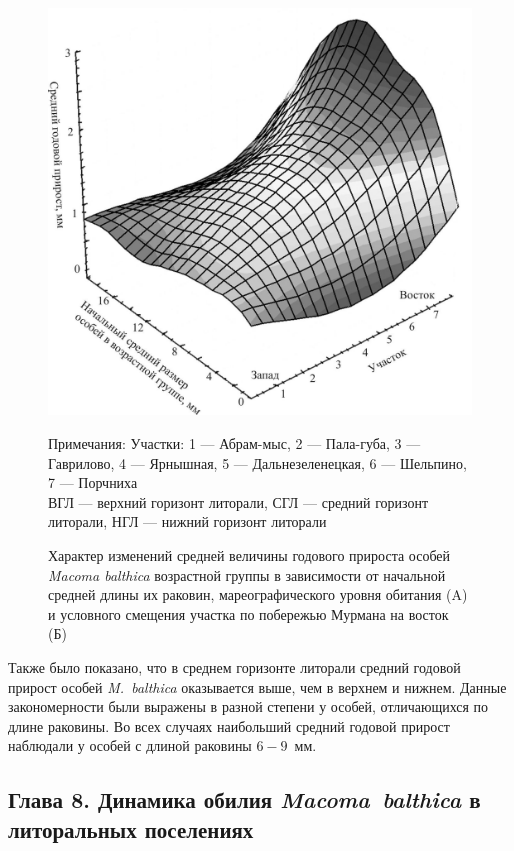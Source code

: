 {\begin{figure}[]
\begin{minipage}[b]{.5\linewidth}
\begin{center}
				\includegraphics[width=\textwidth]{../Barenc_Sea/growth_from_MSc/prirost_otklik_geography.jpg}
			\end{center}
		\end{minipage}
	\caption{Характер изменений средней величины годового прироста особей {\it Macoma balthica} возрастной группы в зависимости от начальной средней длины их раковин, мареографического уровня обитания (A) и условного смещения участка по побережью Мурмана на восток (Б)}
\footnotesize{Примечания: Участки: 1 --- Абрам-мыс, 2 --- Пала-губа, 3 --- Гаврилово, 4 --- Ярнышная, 5 --- Дальнезеленецкая, 6 --- Шельпино, 7 --- Порчниха\\
ВГЛ --- верхний горизонт литорали, СГЛ --- средний горизонт литорали, НГЛ --- нижний горизонт литорали}
	\label{ris:prirost_otklik}
	\end{figure}
Также было показано, что в среднем горизонте литорали средний годовой прирост особей \textit{M.~balthica} оказывается выше, чем в верхнем и нижнем.
Данные закономерности были выражены в разной степени у особей, отличающихся по длине раковины.
Во всех случаях наибольший средний годовой прирост наблюдали у особей с длиной раковины $6 - 9$~мм.



\subsection*{Глава 8. Динамика обилия \textit{Macoma~balthica} в литоральных поселениях}

}
